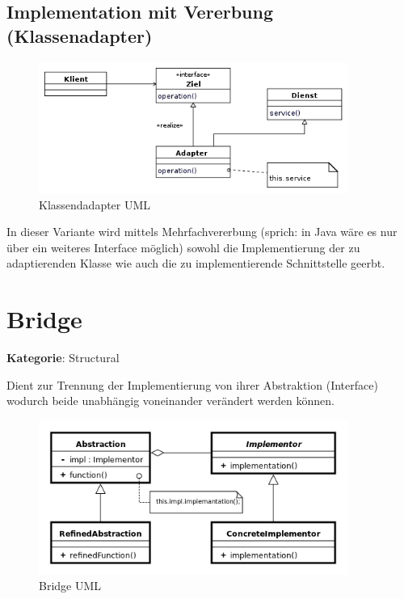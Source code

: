 \subsection*{Implementation mit Vererbung (Klassenadapter)}

\begin{figure}[H]
	\centering
	\includegraphics[width=0.9\textwidth]{content/gof/images/05-adapter-classes-uml.png}
	\caption{Klassendadapter UML}
\end{figure}

In dieser Variante wird mittels Mehrfachvererbung (sprich: in Java wäre es nur über ein weiteres Interface möglich) sowohl die Implementierung der zu adaptierenden Klasse wie auch die zu implementierende Schnittstelle geerbt.

\section{Bridge}
\textbf{Kategorie}: Structural

Dient zur Trennung der Implementierung von ihrer Abstraktion (Interface) wodurch beide unabhängig voneinander verändert werden können.

\begin{figure}[H]
	\centering
	\includegraphics[width=0.9\textwidth]{content/gof/images/06-bridge-uml.png}
	\caption{Bridge UML}
\end{figure}

